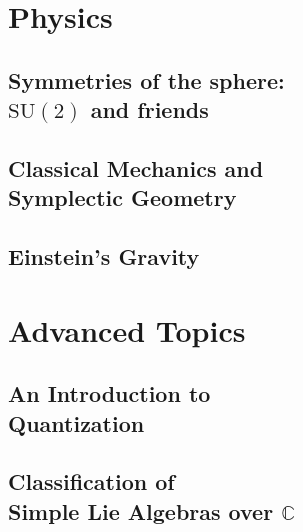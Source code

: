 \documentclass[12pt, twoside, openany]{book}
\begin{document}






\part{Physics}\thispagestyle{empty}

\chapter[Symmetries of the sphere: $\mathrm{SU}(2)$ and friends]{Symmetries of the sphere: \\$\mathrm{SU}(2)$ and friends}

\chapter[Classical Mechanics and Symplectic Geometry]{Classical Mechanics and\\ Symplectic Geometry}\label{ch:Symplectic}

\chapter{Einstein's Gravity}\label{ch:GR}

\part{Advanced Topics}\thispagestyle{empty}

\chapter[An Introduction to Quantization]{An Introduction to \\Quantization}

\chapter[Classification of Simple Lie Algebras over $\mathbb C$]{Classification of\\ Simple Lie Algebras over $\mathbb{C}$}
\end{document}
